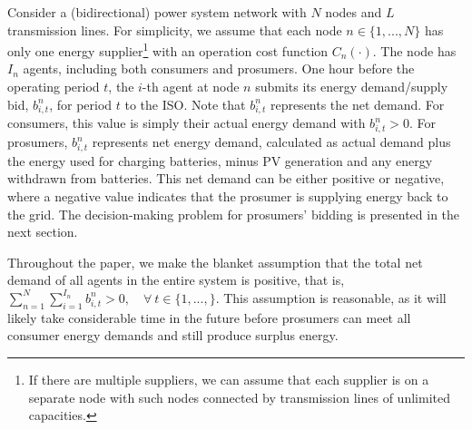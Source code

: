 \documentclass{article}
\theoremstyle{definition}
\theoremstyle{plain}
\begin{document}

Consider a (bidirectional) power system network with $N$ nodes and $L$ transmission lines. For simplicity, we assume that each node $n \in \{1,...,N\}$ has only one energy supplier\footnote{If there are multiple suppliers, we can assume that each supplier is on a separate node with such nodes connected by transmission lines of unlimited capacities.} with an operation cost function $C_n(\cdot)$. The node has $I_n$ agents, including both consumers and prosumers. 
One hour before the operating period \( t \), the \( i \)-th agent at node \( n \) submits its energy demand/supply bid, \( b^{n}_{i,t} \), for period \( t \) to the ISO.
 Note that $b^{n}_{i,t}$ represents the net demand. For consumers, this value is simply their actual energy demand with $b^{n}_{i,t} > 0$. For prosumers, \( b^{n}_{i,t} \) represents net energy demand, calculated as actual demand plus the energy used for charging batteries, minus PV generation and any energy withdrawn from batteries. This net demand can be either positive or negative, where a negative value indicates that the prosumer is supplying energy back to the grid. The decision-making problem for prosumers' bidding is presented in the next section.

Throughout the paper, we make the blanket assumption that the total net demand of all agents in the entire system is positive, that is, 
$\sum_{n=1}^N\sum_{i=1}^{I_n} b^{n}_{i,t} > 0,\quad \forall \ t \in \{1,...,\}.
$
This assumption is reasonable, as it will likely take considerable time in the future before prosumers can meet all consumer energy demands and still produce surplus energy.
\end{document}
